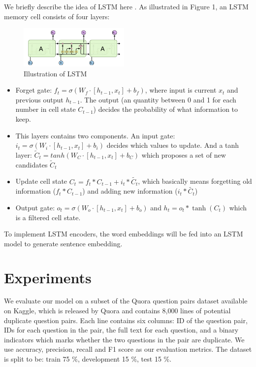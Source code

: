 \documentclass[11pt,a4paper]{article}
\begin{document}
We briefly describe the idea of LSTM here \cite{colah2015lstm}. As illustrated in Figure 1, an LSTM memory cell consists of four layers:
\begin{figure}[htbp]
\centering
\includegraphics[width=0.48\textwidth]{fig/LSTM.png}
\caption{Illustration of LSTM}
\end{figure}
 
\begin{itemize}
    \item Forget gate: $f_t = \sigma(W_f\cdot[h_{t-1},x_t] +b_f)$, where input is current $x_t$ and previous output $h_{t-1}$. The output (an quantity between 0 and 1 for each number in cell state $C_{t-1}$) decides the probability of what information to keep.
    \item This layers contains two components. An input gate: $i_t = \sigma(W_i\cdot[h_{t-1},x_t] +b_i)$ decides which values to update. And a tanh layer: $\tilde{C}_t = tanh(W_C\cdot[h_{t-1},x_t] +b_C)$ which proposes a set of new candidates $\tilde{C}_t $
    \item Update cell state $C_{t} = f_t*C_{t-1} +i_t * \tilde{C_t}$, which basically means forgetting old information ($f_t*C_{t-1}$) and adding new information ($i_t * \tilde{C_t}$)
    \item Output gate: $o_t = \sigma(W_o\cdot[h_{t-1},x_t] +b_o)$ and $h_t = o_t * \tanh(C_t)$ which is a filtered cell state.
\end{itemize}

To implement LSTM encoders, the word embeddings will be fed into an LSTM model to generate sentence embedding. 

\section{Experiments}
We evaluate our model on a subset of the Quora question pairs dataset available on Kaggle, which is released by Quora and contains 8,000 lines of potential duplicate question pairs. Each line contains six columns: ID of the question pair, IDs for each question in the pair, the full text for each question, and a binary indicators which marks whether the two questions in the pair are duplicate. We use accuracy, precision, recall and F1 score as our evaluation metrics. The dataset is split to be: train 75 \%, development 15 \%, test 15 \%.
\end{document}
